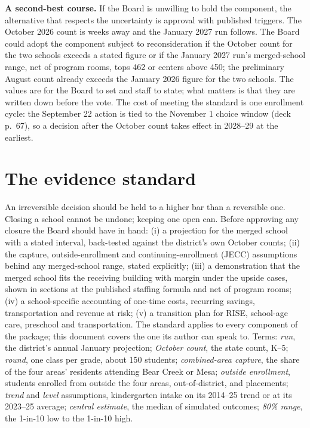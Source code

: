 \documentclass[11pt]{article}
\begin{document}
\noindent\textbf{A second-best course.} If the Board is unwilling to hold the component, the alternative that respects the uncertainty is approval with published triggers. The October 2026 count is weeks away and the January 2027 run follows. The Board could adopt the component subject to reconsideration if the October count for the two schools exceeds a stated figure or if the January 2027 run's merged-school range, net of program rooms, tops 462 or centers above 450; the preliminary August count already exceeds the January 2026 figure for the two schools. The values are for the Board to set and staff to state; what matters is that they are written down before the vote. The cost of meeting the standard is one enrollment cycle: the September 22 action is tied to the November 1 choice window (deck p.\ 67), so a decision after the October count takes effect in 2028--29 at the earliest.

\appendix
\section{The evidence standard}\label{app:standard}
An irreversible decision should be held to a higher bar than a reversible one. Closing a school cannot be undone; keeping one open can. Before approving any closure the Board should have in hand: (i) a projection for the merged school with a stated interval, back-tested against the district's own October counts; (ii) the capture, outside-enrollment and continuing-enrollment (JECC) assumptions behind any merged-school range, stated explicitly; (iii) a demonstration that the merged school fits the receiving building with margin under the upside cases, shown in sections at the published staffing formula and net of program rooms; (iv) a school-specific accounting of one-time costs, recurring savings, transportation and revenue at risk; (v) a transition plan for RISE, school-age care, preschool and transportation. The standard applies to every component of the package; this document covers the one its author can speak to. Terms: \emph{run}, the district's annual January projection; \emph{October count}, the state count, K--5; \emph{round}, one class per grade, about 150 students; \emph{combined-area capture}, the share of the four areas' residents attending Bear Creek or Mesa; \emph{outside enrollment}, students enrolled from outside the four areas, out-of-district, and placements; \emph{trend} and \emph{level} assumptions, kindergarten intake on its 2014--25 trend or at its 2023--25 average; \emph{central estimate}, the median of simulated outcomes; \emph{80\% range}, the 1-in-10 low to the 1-in-10 high.
\end{document}

